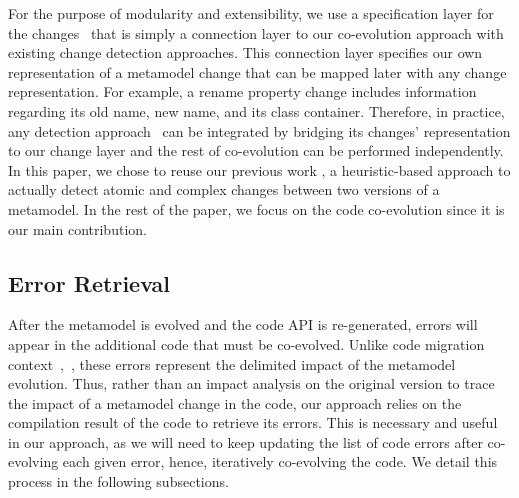 For the purpose of modularity and extensibility, we use a specification layer for the changes~{\small{}} that is simply a connection layer to our co-evolution approach with existing change detection approaches. This connection layer specifies our own representation of a metamodel change that can be mapped later with any change representation.  
For example, a rename property change includes information regarding its old name, new name, and its class container. Therefore, in practice, any detection approach~\cite{Alter2015, williams2012searching,cicchetti_managing_2009,langer_posteriori_2013,vermolen_reconstructing_2012,Khelladi2016,bettini2022executable} can be integrated by bridging its changes' representation to our change layer and the rest of co-evolution can be performed independently.
In this paper, we chose to reuse our previous work \cite{Khelladi2016}, a heuristic-based approach to actually detect atomic and complex changes between two versions of a metamodel.
In the rest of the paper, we focus on the code co-evolution since it is our main contribution. 

\subsection{Error Retrieval}
\label{errorretrieving}

After the metamodel is evolved and the code API is re-generated, errors will appear in the additional code that must be co-evolved. Unlike code migration context~\cite{9079197},~\cite{henkel2005catchup}, these errors represent the delimited impact of the metamodel evolution. Thus, rather than an impact analysis on the original version to trace the impact of a metamodel change in the code, our approach relies on the compilation result of the code to retrieve its errors. 
This is necessary and useful in our approach, as we will need to keep updating the list of code errors after co-evolving each given error, hence, iteratively co-evolving the code. We detail this process in the following subsections.

